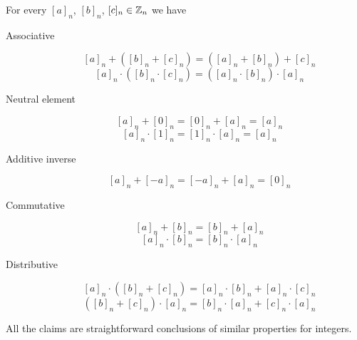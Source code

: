 \begin{proposition}
    For every $[a]_n$, $[b]_n$, $[c]_n\in\mathbb{Z}_n$
    we have 
    \begin{description}
        \item[Associative] \[[a]_n+([b]_n+[c]_n)=([a]_n+[b]_n)+[c]_n\] \[[a]_n\cdot([b]_n\cdot[c]_n)=([a]_n\cdot [b]_n)\cdot[a]_n\]
        \item[Neutral element] \[[a]_n+[0]_n=[0]_n+[a]_n=[a]_n\] \[[a]_n\cdot [1]_n=[1]_n\cdot [a]_n=[a]_n\]
        \item[Additive inverse]  \[[a]_n+[-a]_n=[-a]_n+[a]_n=[0]_n\]
        \item[Commutative] \[[a]_n+[b]_n=[b]_n+[a]_n\] \[[a]_n\cdot [b]_n=[b]_n\cdot [a]_n\]
        \item[Distributive] \[[a]_n\cdot([b]_n+[c]_n)=[a]_n\cdot [b]_n+[a]_n\cdot [c]_n\] \[([b]_n+[c]_n)\cdot [a]_n=[b]_n\cdot [a]_n+[c]_n\cdot [a]_n\] 
    \end{description} 
\end{proposition}
All the claims are straightforward conclusions of similar
properties for integers.